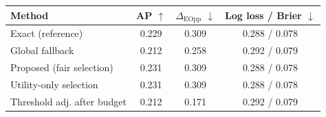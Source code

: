 \begin{tabularx}{\tablewidth}{Xccc}
\toprule
Method & AP $\uparrow$ & $\Delta_{\mathrm{EOpp}}$ $\downarrow$ & Log loss / Brier $\downarrow$\\
\midrule
Exact (reference) & 0.229 & 0.309 & 0.288 / 0.078\\
Global fallback & 0.212 & 0.258 & 0.292 / 0.079\\
Proposed (fair selection) & 0.231 & 0.309 & 0.288 / 0.078\\
Utility-only selection & 0.231 & 0.309 & 0.288 / 0.078\\
Threshold adj. after budget & 0.212 & 0.171 & 0.292 / 0.079\\
\bottomrule
\end{tabularx}
